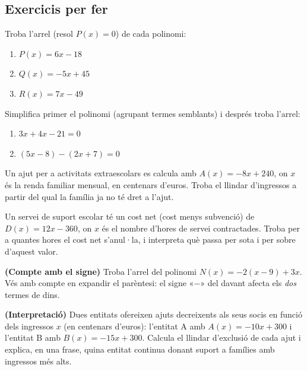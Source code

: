 \subsection{Exercicis per fer}

\begin{exercicis}
\begin{exlist}
  \item Troba l'arrel (resol $P(x)=0$) de cada polinomi:
    \begin{enumerate}[label=\alph*), leftmargin=1.6em, topsep=2pt]
      \item $P(x)=6x-18$
      \item $Q(x)=-5x+45$
      \item $R(x)=7x-49$
    \end{enumerate}

  \item Simplifica primer el polinomi (agrupant termes semblants) i després
        troba l'arrel:
    \begin{enumerate}[label=\alph*), leftmargin=1.6em, topsep=2pt]
      \item $3x+4x-21=0$
      \item $(5x-8)-(2x+7)=0$
    \end{enumerate}

  \item Un ajut per a activitats extraescolars es calcula amb
        $A(x)=-8x+240$, on $x$ és la renda familiar mensual, en centenars
        d'euros. Troba el llindar d'ingressos a partir del qual la família
        ja no té dret a l'ajut.

  \item Un servei de suport escolar té un cost net (cost menys subvenció)
        de $D(x)=12x-360$, on $x$ és el nombre d'hores de servei
        contractades. Troba per a quantes hores el cost net s'anul·la, i
        interpreta què passa per sota i per sobre d'aquest valor.

  \item \textbf{(Compte amb el signe)} Troba l'arrel del polinomi
        $N(x)=-2(x-9)+3x$. Vés amb compte en expandir el parèntesi: el
        signe «$-$» del davant afecta els \emph{dos} termes de dins.

  \item \textbf{(Interpretació)} Dues entitats ofereixen ajuts decreixents
        als seus socis en funció dels ingressos $x$ (en centenars d'euros):
        l'entitat A amb $A(x)=-10x+300$ i l'entitat B amb
        $B(x)=-15x+300$. Calcula el llindar d'exclusió de cada ajut i
        explica, en una frase, quina entitat continua donant suport a
        famílies amb ingressos més alts.
\end{exlist}
\end{exercicis}

